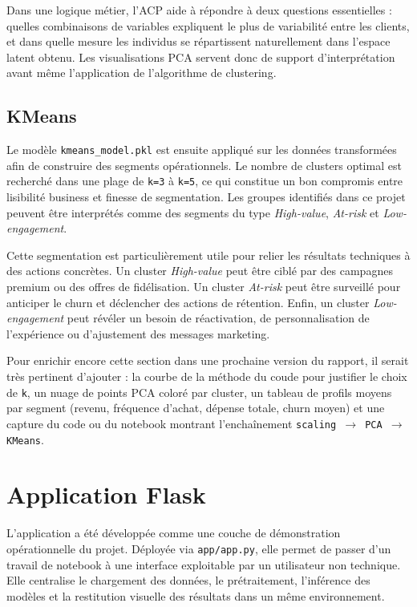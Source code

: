 \documentclass[11pt,a4paper]{article}
\begin{document}
Dans une logique métier, l'ACP aide à répondre à deux questions essentielles : quelles combinaisons de variables expliquent le plus de variabilité entre les clients, et dans quelle mesure les individus se répartissent naturellement dans l'espace latent obtenu. Les visualisations PCA servent donc de support d'interprétation avant même l'application de l'algorithme de clustering.

\subsection{KMeans}
Le modèle \texttt{kmeans\_model.pkl} est ensuite appliqué sur les données transformées afin de construire des segments opérationnels. Le nombre de clusters optimal est recherché dans une plage de \texttt{k=3} à \texttt{k=5}, ce qui constitue un bon compromis entre lisibilité business et finesse de segmentation. Les groupes identifiés dans ce projet peuvent être interprétés comme des segments du type \textit{High-value}, \textit{At-risk} et \textit{Low-engagement}.

Cette segmentation est particulièrement utile pour relier les résultats techniques à des actions concrètes. Un cluster \textit{High-value} peut être ciblé par des campagnes premium ou des offres de fidélisation. Un cluster \textit{At-risk} peut être surveillé pour anticiper le churn et déclencher des actions de rétention. Enfin, un cluster \textit{Low-engagement} peut révéler un besoin de réactivation, de personnalisation de l'expérience ou d'ajustement des messages marketing.


\begin{tcolorbox}[title=Captures recommandées à ajouter]
Pour enrichir encore cette section dans une prochaine version du rapport, il serait très pertinent d'ajouter : la courbe de la méthode du coude pour justifier le choix de \texttt{k}, un nuage de points PCA coloré par cluster, un tableau de profils moyens par segment (revenu, fréquence d'achat, dépense totale, churn moyen) et une capture du code ou du notebook montrant l'enchaînement \texttt{scaling $\rightarrow$ PCA $\rightarrow$ KMeans}.
\end{tcolorbox}

\clearpage

\section{Application Flask}

L'application a été développée comme une couche de démonstration opérationnelle du projet. Déployée via \texttt{app/app.py}, elle permet de passer d'un travail de notebook à une interface exploitable par un utilisateur non technique. Elle centralise le chargement des données, le prétraitement, l'inférence des modèles et la restitution visuelle des résultats dans un même environnement.
\end{document}
